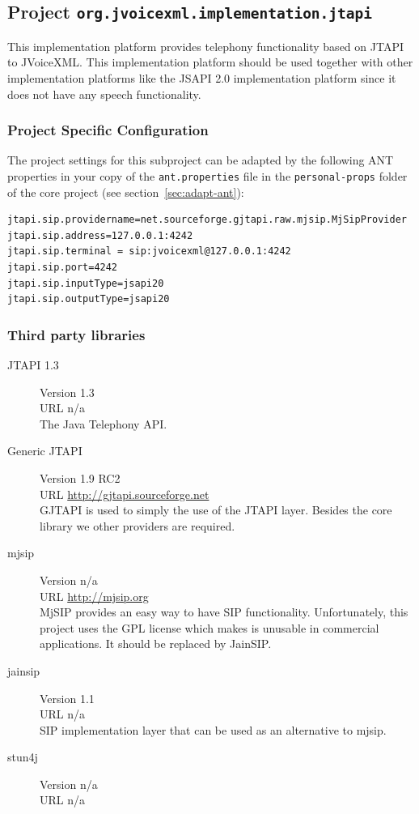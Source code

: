 \documentclass[11pt,a4paper]{article}
\begin{document}
\subsection{Project \texttt{org.jvoicexml.implementation.jtapi}}

This implementation platform provides telephony functionality based on JTAPI to
JVoiceXML. This implementation platform should be used together with other
implementation platforms like the JSAPI 2.0 implementation platform since it
does not have any speech functionality.

\subsubsection{Project Specific Configuration}

The project settings for this subproject can be adapted by the following ANT
properties in your copy of the \texttt{ant.properties} file in the
\texttt{personal-props} folder of the core project (see 
section~\ref{sec:adapt-ant}):
\begin{lstlisting}
jtapi.sip.providername=net.sourceforge.gjtapi.raw.mjsip.MjSipProvider
jtapi.sip.address=127.0.0.1:4242
jtapi.sip.terminal = sip:jvoicexml@127.0.0.1:4242
jtapi.sip.port=4242
jtapi.sip.inputType=jsapi20
jtapi.sip.outputType=jsapi20
\end{lstlisting}

\subsubsection{Third party libraries}
\label{sec:jtapi-third-party-libr}

\begin{description}
\item[JTAPI 1.3] Version 1.3 \\
URL n/a \\
The Java Telephony API.
\item[Generic JTAPI] Version 1.9 RC2 \\
URL \url{http://gjtapi.sourceforge.net} \\
GJTAPI is used to simply the use of the JTAPI layer. Besides the core library
we other providers are required.
\item[mjsip] Version n/a \\
URL \url{http://mjsip.org} \\
MjSIP provides an easy way to have SIP functionality. Unfortunately, this
project uses the GPL license which makes is unusable in commercial
applications. It should be replaced by JainSIP.
\item[jainsip] Version 1.1 \\
URL n/a \\
SIP implementation layer that can be used as an alternative to mjsip.
\item[stun4j] Version n/a \\
URL n/a
\end{description}
\end{document}
